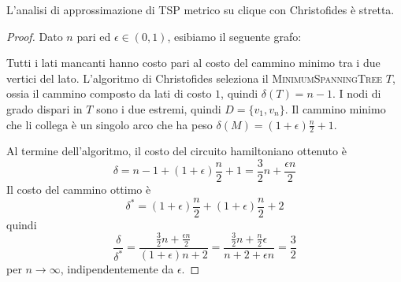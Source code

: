 \begin{theorem}
	L'analisi di approssimazione  di TSP metrico su clique con Christofides è stretta.
\end{theorem}
\begin{proof}
	Dato $n$ pari ed $\epsilon \in (0,1)$, esibiamo il seguente grafo:

	\begin{figure}[h]
		\centering
	\end{figure}
	Tutti i lati mancanti hanno costo pari al costo del cammino minimo tra i due vertici del lato.
	L'algoritmo di Christofides seleziona il \textsc{MinimumSpanningTree} $T$, ossia il cammino composto da
	lati di costo $1$, quindi $\delta(T) = n - 1$. I nodi di grado dispari in $T$ sono
	i due estremi, quindi $D = \{v_1, v_n\}$. Il cammino minimo che li collega è
	un singolo arco che ha peso $\delta(M) = (1 + \epsilon) \frac{n}{2} + 1$.

	Al termine dell'algoritmo, il costo del circuito hamiltoniano ottenuto è
	$$
		\delta = n - 1 +  (1 + \epsilon) \frac{n}{2} + 1 = \frac{3}{2}n + \frac{\epsilon n}{2}
	$$
	Il costo del cammino ottimo è
	$$
		\delta^* = (1 + \epsilon) \frac{n}{2} + (1 + \epsilon) \frac{n}{2} +2
	$$
	quindi
	$$
		\frac{\delta}{\delta^*} = \frac{\frac{3}{2}n + \frac{\epsilon n}{2}}{(1 + \epsilon)n +2}
		= \frac{\frac{3}{2} n + \frac{n}{2}\epsilon}{n + 2 + \epsilon n} = \frac{3}{2}
	$$
	per $n \rightarrow \infty$, indipendentemente da $\epsilon$.
\end{proof}

